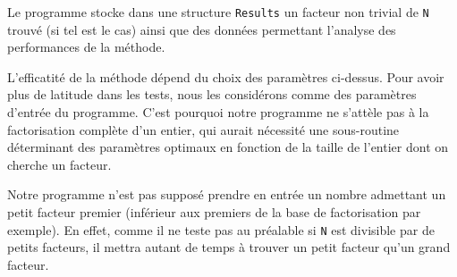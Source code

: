 Le programme stocke dans une structure \texttt{Results} un facteur non trivial
de \texttt{N} trouvé (si tel est le cas) ainsi que des données permettant 
l'analyse des performances de la méthode.  

\begin{remarque}
	L'efficatité de la méthode dépend du choix des paramètres ci-dessus. Pour
	avoir plus de latitude dans les tests, nous les considérons comme des
	paramètres d'entrée du programme. C'est pourquoi notre programme ne
	s'attèle pas à la factorisation complète d'un entier, qui aurait nécessité
	une sous-routine déterminant des paramètres optimaux en fonction de la
	taille de l'entier dont on cherche un facteur. 
\end{remarque}

\begin{remarque}
	Notre programme n'est pas supposé prendre en entrée un nombre admettant un
	petit facteur premier (inférieur aux premiers de la base de factorisation
	par exemple).  En effet, comme il ne teste pas au préalable si \texttt{N}
	est divisible par de petits facteurs, il mettra autant de temps à trouver
	un petit facteur qu'un grand facteur.
\end{remarque}
